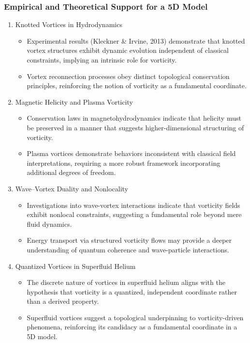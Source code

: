 \subsubsection*{Empirical and Theoretical Support for a 5D Model}
\begin{enumerate}
    \item Knotted Vortices in Hydrodynamics
    \begin{itemize}
        \item Experimental results (Kleckner \& Irvine, 2013) demonstrate that knotted vortex structures exhibit dynamic evolution independent of classical constraints, implying an intrinsic role for vorticity.
        \item Vortex reconnection processes obey distinct topological conservation principles, reinforcing the notion of vorticity as a fundamental coordinate.
    \end{itemize}

    \item Magnetic Helicity and Plasma Vorticity
    \begin{itemize}
        \item Conservation laws in magnetohydrodynamics indicate that helicity must be preserved in a manner that suggests higher-dimensional structuring of vorticity.
        \item Plasma vortices demonstrate behaviors inconsistent with classical field interpretations, requiring a more robust framework incorporating additional degrees of freedom.
    \end{itemize}

    \item Wave–Vortex Duality and Nonlocality
    \begin{itemize}
        \item Investigations into wave-vortex interactions indicate that vorticity fields exhibit nonlocal constraints, suggesting a fundamental role beyond mere fluid dynamics.
        \item Energy transport via structured vorticity flows may provide a deeper understanding of quantum coherence and wave-particle interactions.
    \end{itemize}

    \item Quantized Vortices in Superfluid Helium
    \begin{itemize}
        \item The discrete nature of vortices in superfluid helium aligns with the hypothesis that vorticity is a quantized, independent coordinate rather than a derived property.
        \item Superfluid vortices suggest a topological underpinning to vorticity-driven phenomena, reinforcing its candidacy as a fundamental coordinate in a 5D model.
    \end{itemize}
\end{enumerate}

